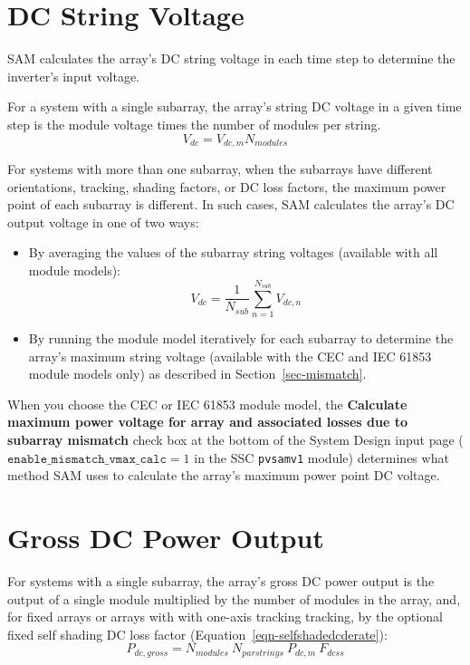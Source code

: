 \documentclass[12pt,letterpaper]{article}
\begin{document}
\section{DC String Voltage}\label{sec-dcstringvoltage}

SAM calculates the array's DC string voltage in each time step to determine the inverter's input voltage.

For a system with a single subarray, the array's string DC voltage in a given time step is the module voltage times the number of modules per string.
\begin{equation}
V_{dc} = V_{dc,m} N_{modules}
\end{equation}

For systems with more than one subarray, when the subarrays have different orientations, tracking, shading factors, or DC loss factors, the maximum power point of each subarray is different. In such cases, SAM calculates the array's DC output voltage in one of two ways:
\begin{itemize}
\item By averaging the values of the subarray string voltages (available with all module models): 
\begin{equation}
V_{dc} =  \frac{1}{N_{sub}}\sum_{n=1}^{N_{sub}} V_{dc,n}
\end{equation}
\item By running the module model iteratively for each subarray to determine the array's maximum string voltage (available with the CEC and IEC 61853 module models only) as described in Section~\ref{sec-mismatch}.
\end{itemize}

When you choose the CEC or IEC 61853 module model, the \textbf{Calculate maximum power voltage for array and associated losses due to subarray mismatch} check box at the bottom of the System Design input page ($\mathtt{enable\_mismatch\_vmax\_calc}=1$ in the SSC \texttt{pvsamv1} module) determines what method SAM uses to calculate the array's maximum power point DC voltage.

\section{Gross DC Power Output}

For systems with a single subarray, the array's gross DC power output is the output of a single module multiplied by the number of modules in the array, and, for fixed arrays or arrays with  with one-axis tracking tracking, by the optional fixed self shading DC loss factor (Equation~\ref{eqn-selfshadedcderate}):
\begin{equation}
P_{dc,gross} = N_{modules}~N_{parstrings}~P_{dc,m}~F_{dcss}
\end{equation}
\end{document}
